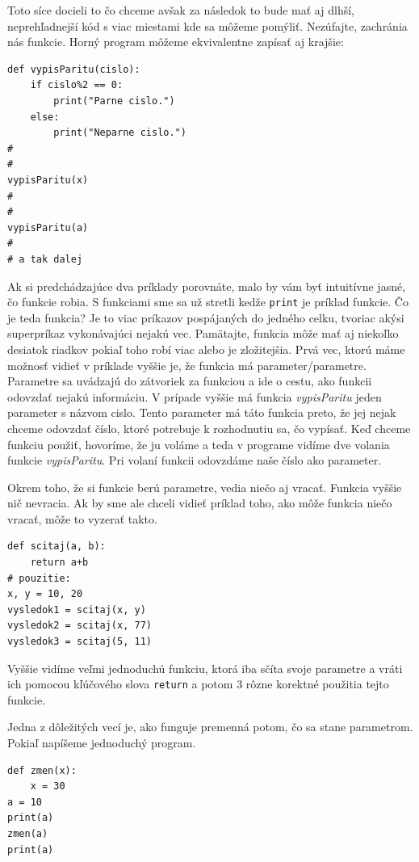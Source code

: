 Toto síce docieli to čo chceme avšak za následok to bude mať aj dlhší, neprehľadnejší kód s viac miestami kde sa môžeme pomýliť. Nezúfajte, zachránia nás funkcie. Horný program môžeme ekvivalentne zapísať aj krajšie:

\begin{lstlisting}
def vypisParitu(cislo):
    if cislo%2 == 0:
        print("Parne cislo.")
    else:
        print("Neparne cislo.")
#   
#
vypisParitu(x)
#
#
vypisParitu(a)
#
# a tak dalej
\end{lstlisting}

Ak si predchádzajúce dva príklady porovnáte, malo by vám byť intuitívne jasné, čo funkcie robia. S funkciami sme sa už stretli kedže \texttt{print} je príklad funkcie. Čo je teda funkcia? Je to viac príkazov pospájaných do jedného celku, tvoriac akýsi superpríkaz vykonávajúci nejakú vec. Pamätajte, funkcia môže mať aj niekoľko desiatok riadkov pokiaľ toho robí viac alebo je zložitejšia. Prvá vec, ktorú máme možnosť vidieť v príklade vyššie je, že funkcia má parameter/parametre. Parametre sa uvádzajú do zátvoriek za funkciou a ide o cestu, ako funkcii odovzdať nejakú informáciu. V prípade vyššie má funkcia \textit{vypisParitu} jeden parameter s názvom cislo. Tento parameter má táto funkcia preto, že jej nejak chceme odovzdať číslo, ktoré potrebuje k rozhodnutiu sa, čo vypísať. Keď chceme funkciu použiť, hovoríme, že ju voláme a teda v programe vidíme dve volania funkcie \textit{vypisParitu}. Pri volaní funkcii odovzdáme naše číslo ako parameter.

Okrem toho, že si funkcie berú parametre, vedia niečo aj vracať. Funkcia vyššie nič nevracia. Ak by sme ale chceli vidieť príklad toho, ako môže funkcia niečo vracať, môže to vyzerať takto.

\begin{lstlisting}
def scitaj(a, b):
    return a+b
# pouzitie:
x, y = 10, 20
vysledok1 = scitaj(x, y)
vysledok2 = scitaj(x, 77)
vysledok3 = scitaj(5, 11)
\end{lstlisting}

Vyššie vidíme veľmi jednoduchú funkciu, ktorá iba sčíta svoje parametre a vráti ich pomocou kľúčového slova \texttt{return} a potom 3 rôzne korektné použitia tejto funkcie.

Jedna z dôležitých vecí je, ako funguje premenná potom, čo sa stane parametrom. Pokiaľ napíšeme jednoduchý program.

\begin{lstlisting}
def zmen(x):
    x = 30
a = 10
print(a)
zmen(a)
print(a)
\end{lstlisting}

